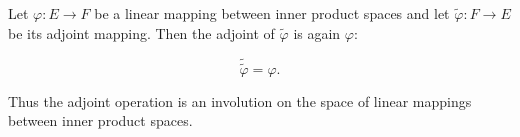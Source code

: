 Let $\varphi: E \rightarrow F$ be a linear mapping between inner product spaces and let $\tilde{\varphi}: F \rightarrow E$ be its adjoint mapping. Then the adjoint of $\tilde{\varphi}$ is again $\varphi$:

$$\tilde{\tilde{\varphi}} = \varphi.$$

Thus the adjoint operation is an involution on the space of linear mappings between inner product spaces.
